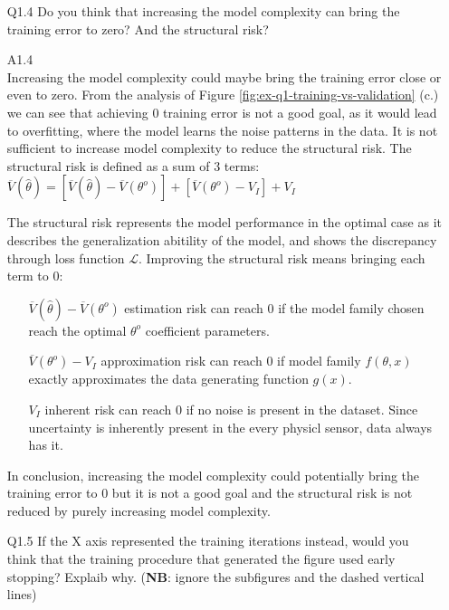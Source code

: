 \documentclass[unicode, 11pt, a4paper]{scrartcl}
\begin{document}
\begin{itemize}
	\item[Q1.4] Do you think that increasing the model complexity can bring the training error to zero?
	      And the structural risk?

	\item[A1.4] ~\\
	      Increasing the model complexity could maybe bring the training error close or even to zero.
	      From the analysis of Figure \ref{fig:ex-q1-training-vs-validation} (c.) we can see that
	      achieving 0 training error is not a good goal, as it would lead to overfitting,
	      where the model learns the noise patterns in the data.
	      It is not sufficient to increase model complexity to reduce the structural risk. \newline
	      The structural risk is defined as a sum of 3 terms: \newline
	      $\overline{V}(\hat{\theta}) = [\overline{V}(\hat{\theta}) - \overline{V}(\theta^o)]
		      + [\overline{V}(\theta^o) - V_I]
		      + V_I$

	      The structural risk represents the model performance in the optimal case
	      as it describes the generalization abitility of the model,
	      and shows the discrepancy through loss function $\mathcal{L}$.
	      Improving the structural risk means bringing each term to 0:

	      \begin{itemize}
		      \item[] $\overline{V}(\hat{\theta}) - \overline{V}(\theta^o)$
		            estimation risk can reach 0 if the model family chosen reach the optimal $\theta^o$
		            coefficient parameters.

		      \item[] $\overline{V}(\theta^o) - V_I$ approximation risk can reach 0
		            if model family $f(\theta, x)$ exactly approximates the data generating function $g(x)$.

		      \item[] $V_I$ inherent risk can reach 0 if no noise is present in the dataset.
		            Since uncertainty is inherently present in the every physicl sensor, data always has it.
	      \end{itemize}
	      In conclusion, increasing the model complexity could potentially bring the training error to 0
	      but it is not a good goal
	      and the structural risk is not reduced by purely increasing model complexity.

	\item[Q1.5] If the X axis represented the training iterations instead,
	      would you think that the training procedure that generated the figure used early stopping?
	      Explaib why. (\textbf{NB}: ignore the subfigures and the dashed vertical lines)


\end{itemize}
\end{document}
